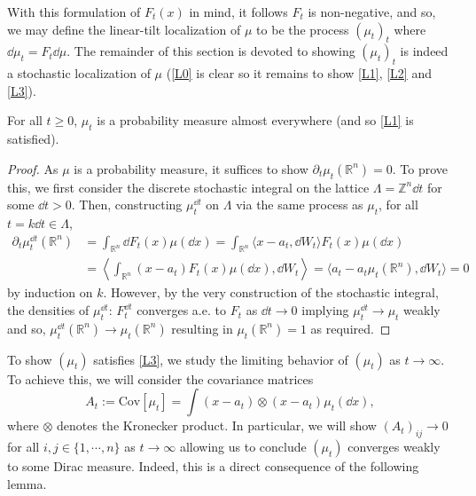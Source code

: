With this formulation of \(F_t(x)\) in mind, it follows \(F_t\) is non-negative, and so, 
we may define the linear-tilt localization of \(\mu\) to be the process \((\mu_t)_t\) 
where \(\dd \mu_t = F_t \dd \mu\). The remainder of this section is devoted to showing \((\mu_t)_t\) is 
indeed a stochastic localization of \(\mu\) (\ref{L0} is clear so it remains to show \ref{L1}, \ref{L2} and \ref{L3}).

\begin{proposition}
  For all \(t \ge 0\), \(\mu_t\) is a probability measure almost everywhere (and so \ref{L1} is satisfied).
\end{proposition}
\begin{proof}
  As \(\mu\) is a probability measure, it suffices to show \(\partial_t \mu_t(\mathbb{R}^n) = 0\).
  To prove this, we first consider the discrete stochastic integral on the lattice \(\Lambda = \mathbb{Z}^n \dd t\)
  for some \(\dd t > 0\). Then, constructing \(\mu_t^{\dd t}\) on \(\Lambda\) via the same process as \(\mu_t\),
  for all \(t = k \dd t \in \Lambda\),
  \begin{align*}
    \partial_t \mu_t^{\dd t}(\mathbb{R}^n) 
      & = \int_{\mathbb{R}^n} \dd F_t(x) \mu(\dd x) 
        = \int_{\mathbb{R}^n} \langle x - a_t, \dd W_t\rangle F_t(x) \mu(\dd x)\\
      & = \left\langle \int_{\mathbb{R}^n} (x - a_t) F_t(x)\mu(\dd x), \dd W_t \right\rangle
        = \langle a_t - a_t\mu_t(\mathbb{R}^n), \dd W_t \rangle = 0
  \end{align*}
  by induction on \(k\). However, by the very construction of the stochastic integral, the densities 
  of \(\mu_t^{\dd t}\): \(F_t^{\dd t}\) converges a.e. to \(F_t\) as \(\dd t \to 0\) implying 
  \(\mu_t^{\dd t} \to \mu_t\) weakly and so, \(\mu_t^{\dd t}(\mathbb{R}^n) \to \mu_t(\mathbb{R}^n)\)
  resulting in \(\mu_t(\mathbb{R}^n) = 1\) as required.
\end{proof}

To show \((\mu_t)\) satisfies \ref{L3}, we study the limiting behavior of \((\mu_t)\) as \(t \to \infty\). 
To achieve this, we will consider the covariance matrices
\begin{equation}
  A_t := \text{Cov}[\mu_t] = \int (x - a_t) \otimes (x - a_t) \mu_t(\dd x),
\end{equation}
where \(\otimes\) denotes the Kronecker product. In particular, we will show \((A_t)_{ij} \to 0\) for all
 \(i, j \in \{1, \cdots, n\}\) as \(t \to \infty\) allowing us to conclude \((\mu_t)\) converges weakly 
 to some Dirac measure. Indeed, this is a direct consequence of the following lemma.

